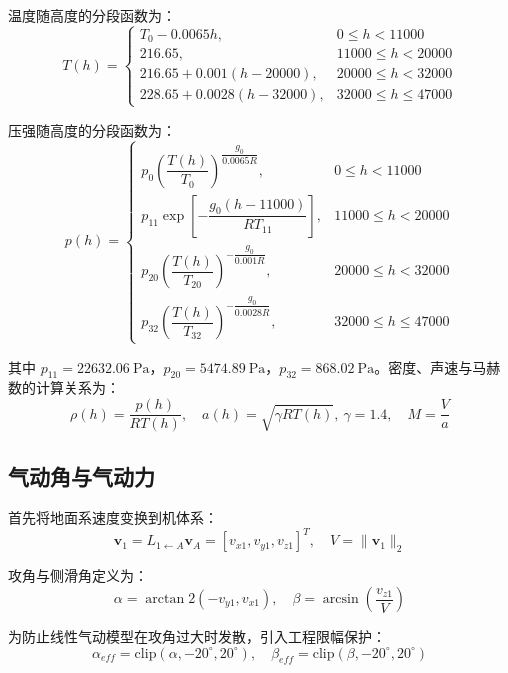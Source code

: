 温度随高度的分段函数为：
\begin{equation}
T(h)=
\begin{cases}
T_0-0.0065h, & 0\le h<11000 \\[4pt]
216.65, & 11000\le h<20000 \\[4pt]
216.65+0.001(h-20000), & 20000\le h<32000 \\[4pt]
228.65+0.0028(h-32000), & 32000\le h\le47000
\end{cases}
\end{equation}

压强随高度的分段函数为：
\begin{equation}
p(h)=
\begin{cases}
p_0\left(\dfrac{T(h)}{T_0}\right)^{\dfrac{g_0}{0.0065R}}, & 0\le h<11000 \\[10pt]
p_{11}\exp\!\left[-\dfrac{g_0(h-11000)}{RT_{11}}\right], & 11000\le h<20000 \\[10pt]
p_{20}\left(\dfrac{T(h)}{T_{20}}\right)^{-\dfrac{g_0}{0.001R}}, & 20000\le h<32000 \\[10pt]
p_{32}\left(\dfrac{T(h)}{T_{32}}\right)^{-\dfrac{g_0}{0.0028R}}, & 32000\le h\le47000
\end{cases}
\end{equation}

其中 $p_{11}=22632.06\ \mathrm{Pa}$，$p_{20}=5474.89\ \mathrm{Pa}$，$p_{32}=868.02\ \mathrm{Pa}$。密度、声速与马赫数的计算关系为：
\begin{equation}
\rho(h)=\frac{p(h)}{RT(h)},\quad
a(h)=\sqrt{\gamma RT(h)},\ \gamma=1.4,\quad
M=\frac{V}{a}
\end{equation}

\subsection{气动角与气动力}

首先将地面系速度变换到机体系：
\begin{equation}
\mathbf v_1=L_{1\leftarrow A}\mathbf v_A=[v_{x1},v_{y1},v_{z1}]^T,\quad V=\|\mathbf v_1\|_2 
\end{equation}

攻角与侧滑角定义为：
\begin{equation}
\alpha=\arctan2(-v_{y1},v_{x1}),\quad
\beta=\arcsin\!\left(\frac{v_{z1}}{V}\right) 
\end{equation}

为防止线性气动模型在攻角过大时发散，引入工程限幅保护：
\begin{equation}
\alpha_{eff}=\mathrm{clip}(\alpha,-20^\circ,20^\circ),\quad
\beta_{eff}=\mathrm{clip}(\beta,-20^\circ,20^\circ) 
\end{equation}

